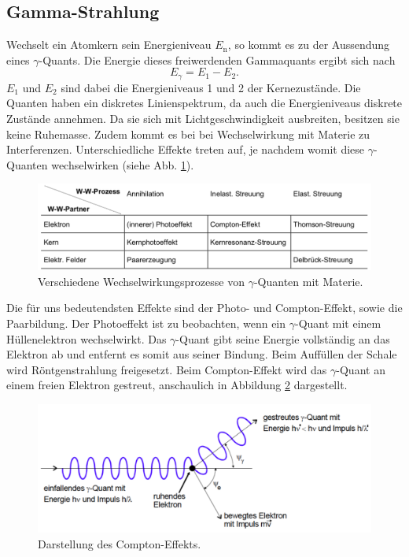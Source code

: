 \subsection{Gamma-Strahlung}
Wechselt ein Atomkern sein Energieniveau $E_\text{n}$, so kommt es zu der Aussendung eines $\gamma$-Quants. Die Energie dieses freiwerdenden Gammaquants ergibt sich nach
\begin{equation*}
	E_\gamma = E_1 - E_2 .
\end{equation*}
$E_1$ und $E_2$ sind dabei die Energieniveaus 1 und 2 der Kernezustände.
Die Quanten haben ein diskretes Linienspektrum, da auch die Energieniveaus diskrete Zustände annehmen. Da sie sich mit Lichtgeschwindigkeit ausbreiten, besitzen sie keine Ruhemasse. Zudem kommt es bei bei Wechselwirkung mit Materie zu Interferenzen. Unterschiedliche Effekte treten auf, je nachdem womit diese $\gamma$-Quanten wechselwirken (siehe Abb. \ref{fig:Effekte}).
\begin{figure}[H]
    \centering
    \includegraphics[scale=0.7]{Theorie/Effekte.pdf}
    \caption{Verschiedene Wechselwirkungsprozesse von $\gamma$-Quanten mit Materie.}
    \label{fig:Effekte}
\end{figure}
Die für uns bedeutendsten Effekte sind der Photo- und Compton-Effekt, sowie die Paarbildung. \*
Der Photoeffekt ist zu beobachten, wenn ein $\gamma$-Quant mit einem Hüllenelektron wechselwirkt. Das $\gamma$-Quant gibt seine Energie vollständig an das Elektron ab und entfernt es somit aus seiner Bindung. Beim Auffüllen der Schale wird Röntgenstrahlung freigesetzt. \*
Beim Compton-Effekt wird das $\gamma$-Quant an einem freien Elektron gestreut, anschaulich in Abbildung \ref{fig:Compton} dargestellt.
\begin{figure}[H]
    \centering
    \includegraphics[scale=0.7]{Theorie/Compton.pdf}
    \caption{Darstellung des Compton-Effekts.}
    \label{fig:Compton}
\end{figure}
